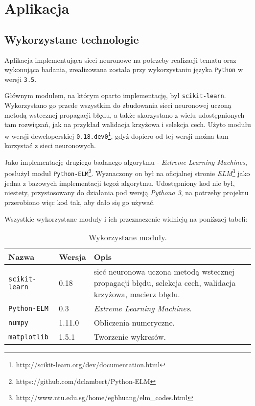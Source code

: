 \chapter{Aplikacja}

\section{Wykorzystane technologie}

Aplikacja implementująca sieci neuronowe na potrzeby realizacji tematu oraz wykonująca badania, zrealizowana została przy wykorzystaniu języka \texttt{Python} w wersji \texttt{3.5}.

Głównym modułem, na którym oparto implementację, był \texttt{scikit-learn}. Wykorzystano go przede wszystkim do zbudowania sieci neuronowej uczoną metodą wstecznej propagacji błędu, a także skorzystano z wielu udostępnionych tam rozwiązań, jak na przykład walidacja krzyżowa i selekcja cech. Użyto modułu w wersji deweloperskiej \texttt{0.18.dev0}\footnote{http://scikit-learn.org/dev/documentation.html}, gdyż dopiero od tej wersji można tam korzystać z sieci neuronowych.

Jako implementację drugiego badanego algorytmu - \textit{Extreme Learning Machines}, posłużył moduł \texttt{Python-ELM}\footnote{https://github.com/dclambert/Python-ELM}. Wyznaczony on był na oficjalnej stronie \textit{ELM}\footnote{http://www.ntu.edu.sg/home/egbhuang/elm\_codes.html} jako jedna z bazowych implementacji tegoż algorytmu. Udostępniony kod nie był, niestety, przystosowany do działania pod wersją \textit{Pythona 3}, na potrzeby projektu przerobiono więc kod tak, aby dało się go używać.

Wszystkie wykorzystane moduły i ich przeznaczenie widnieją na poniższej tabeli:

\begin{table}[h!]
    \centering
    \caption{Wykorzystane moduły.}
    \begin{tabular}{p{3cm}p{2cm}p{11cm}}
        \toprule
        \textbf{Nazwa} & \textbf{Wersja} & \textbf{Opis} \\
        \midrule
        \texttt{scikit-learn} & 0.18 & sieć neuronowa uczona metodą wstecznej propagacji błędu, selekcja cech, walidacja krzyżowa, macierz błędu. \\
        \texttt{Python-ELM} & 0.3 & \textit{Extreme Learning Machines}. \\
        \texttt{numpy} & 1.11.0 & Obliczenia numeryczne. \\
        \texttt{matplotlib} & 1.5.1 & Tworzenie wykresów. \\
        \bottomrule
    \end{tabular}
\end{table}

